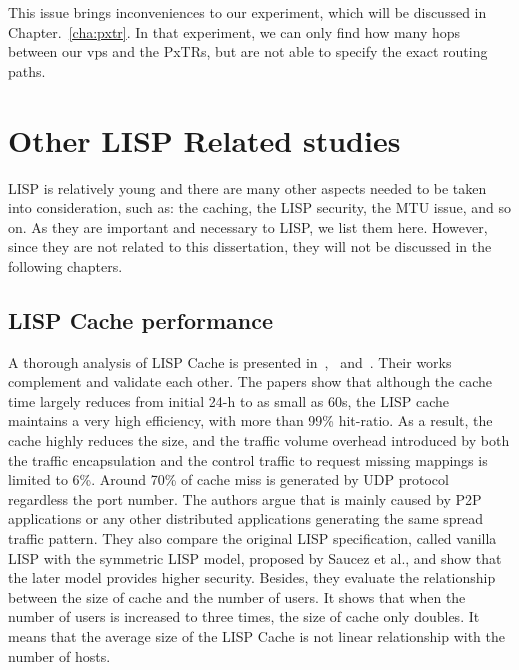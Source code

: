 This issue brings inconveniences to our experiment, which will be discussed in Chapter.~\ref{cha:pxtr}. In that experiment, we can only find how many hops between our \acrshort{vp}s and the PxTRs, but are not able to specify the exact routing paths.

\section{Other LISP Related studies}
\label{subsec:other_studies}
LISP is relatively young and there are many other aspects needed to be taken into consideration, such as: the caching, the LISP security, the MTU issue, and so on. As they are important and necessary to LISP, we list them here. However, since they are not related to this dissertation, they will not be discussed in the following chapters.

\subsection{LISP Cache performance}
\label{subsec:cache}

A thorough analysis of LISP Cache is presented in~\cite{lispCacheCost},~\cite{lispCacheDive} and~\cite{kim2013caching}. Their works complement and validate each other. The papers %
show that although the cache time largely reduces from initial 24-h to as small as 60s, the LISP cache maintains a very high efficiency, with more than 99\% hit-ratio. As a result, the cache highly reduces the size, and the traffic volume overhead introduced by both the traffic encapsulation and the control traffic to request missing mappings is limited to 6\%. Around 70\% of cache miss is generated by UDP protocol regardless the port number. The authors argue that is mainly caused by P2P applications or any other distributed applications generating the same spread traffic pattern. They also compare the original LISP specification, called vanilla LISP with the symmetric LISP model, proposed by Saucez et al., and show that the later model provides higher security. Besides, they evaluate the relationship between the size of cache and the number of users. It shows that when the number of users is increased to three times, the size of cache only doubles. It means that the average size of the LISP Cache is not linear relationship with the number of hosts.

